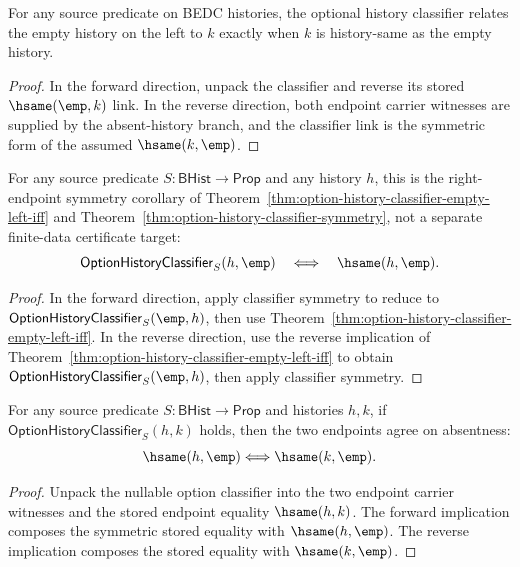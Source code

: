 \begin{theorem}
\label{thm:option-history-classifier-empty-left-iff}
For any source predicate on BEDC histories, the optional history classifier
relates the empty history on the left to $k$ exactly when $k$ is
history-same as the empty history.
\end{theorem}
\begin{proof}
In the forward direction, unpack the classifier and reverse its stored
$\hsame(\emp,k)$ link. In the reverse direction, both endpoint carrier
witnesses are supplied by the absent-history branch, and the classifier link is
the symmetric form of the assumed $\hsame(k,\emp)$.
\end{proof}

\begin{corollary}
\label{thm:option-history-classifier-empty-right-iff}
For any source predicate $S:\mathsf{BHist}\to\mathsf{Prop}$ and any history $h$, this is the right-endpoint symmetry corollary of
Theorem~\ref{thm:option-history-classifier-empty-left-iff} and Theorem~\ref{thm:option-history-classifier-symmetry}, not a separate finite-data certificate target:
$$
\mathsf{OptionHistoryClassifier}_S(h,\emp)\quad\Longleftrightarrow\quad\hsame(h,\emp).
$$
\end{corollary}
\begin{proof}
In the forward direction, apply classifier symmetry to reduce to $\mathsf{OptionHistoryClassifier}_S(\emp,h)$, then use
Theorem~\ref{thm:option-history-classifier-empty-left-iff}. In the reverse direction, use the reverse implication of
Theorem~\ref{thm:option-history-classifier-empty-left-iff} to obtain
$\mathsf{OptionHistoryClassifier}_S(\emp,h)$, then apply classifier symmetry.
\end{proof}

\begin{theorem}
\label{thm:option-history-classifier-empty-endpoint-equivalence}
For any source predicate $S:\mathsf{BHist}\to\mathsf{Prop}$ and histories $h,k$,
if $\mathsf{OptionHistoryClassifier}_S(h,k)$ holds, then the two endpoints agree
on absentness:
$$
\hsame(h,\emp)\Longleftrightarrow\hsame(k,\emp).
$$
\end{theorem}
\begin{proof}
Unpack the nullable option classifier into the two endpoint carrier witnesses
and the stored endpoint equality $\hsame(h,k)$. The forward implication composes
the symmetric stored equality with $\hsame(h,\emp)$. The reverse implication
composes the stored equality with $\hsame(k,\emp)$.
\end{proof}

